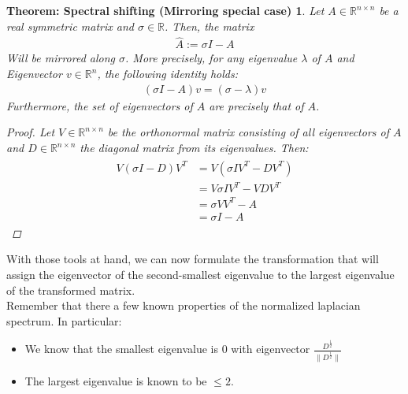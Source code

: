 \documentclass[10pt, a4paper, twocolumn]{article} %
\begin{document}
    \newtheorem{shifting}[]{Theorem: Spectral shifting (Mirroring special case)}[section]
    \begin{shifting}
        Let $A \in \mathbb{R}^{n \times n}$ be a real symmetric matrix and $\sigma \in \mathbb{R}$.
        Then, the matrix
        \begin{align}
            \hat{A} := \sigma I - A
        \end{align}
        Will be mirrored along $\sigma$. More precisely, for any eigenvalue $\lambda$ of $A$ and Eigenvector
        $v \in \mathbb{R}^n$, the following identity holds:
        \begin{align}
            \left( \sigma I -A \right) v = \left( \sigma - \lambda \right) v
        \end{align}
        Furthermore, the set of eigenvectors of $\hat{A}$ are precisely that of $A$.
        \begin{proof}[Proof]
            Let $V \in \mathbb{R}^{n \times n}$ be the orthonormal matrix consisting of all eigenvectors of $A$
            and $D \in \mathbb{R}^{n \times n}$ the diagonal matrix from its eigenvalues. Then:
            \begin{align}
                \begin{split}
                    V \left( \sigma I - D \right) V^T & = V \left( \sigma I V^T - D V ^T \right) \\
                    & = V \sigma I V^T - VDV^T \\
                    & = \sigma V V^T - A \\
                    & = \sigma I -A
                \end{split}
            \end{align}
        \end{proof}
    \end{shifting}

    With those tools at hand, we can now formulate the transformation that will assign the eigenvector of the
    second-smallest eigenvalue to the largest eigenvalue of the transformed matrix.
    \\
    Remember that there a few known properties of the normalized laplacian spectrum. In particular:
    \begin{itemize}
        \item We know that the smallest eigenvalue is $0$ with eigenvector $\frac{D^\frac{1}{2}}{\lVert D^\frac{1}{2} \rVert}$ %
        \item The largest eigenvalue is known to be $ \leq 2$.
    \end{itemize}
\end{document}
